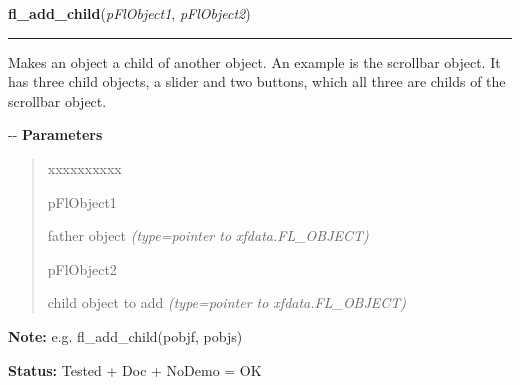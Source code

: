 \hspace{.8\funcindent}\begin{boxedminipage}{\funcwidth}

    \raggedright \textbf{fl\_add\_child}(\textit{pFlObject1}, \textit{pFlObject2})

    \vspace{-1.5ex}

    \rule{\textwidth}{0.5\fboxrule}
\setlength{\parskip}{2ex}

Makes an object a child of another object. An example is the scrollbar
object. It has three child objects, a slider and two buttons, which all
three are childs of the scrollbar object.

-{}-
\setlength{\parskip}{1ex}
      \textbf{Parameters}
      \vspace{-1ex}

      \begin{quote}
        \begin{Ventry}{xxxxxxxxxx}

          \item[pFlObject1]


father object
            {\it (type=pointer to xfdata.FL\_OBJECT)}

          \item[pFlObject2]


child object to add
            {\it (type=pointer to xfdata.FL\_OBJECT)}

        \end{Ventry}

      \end{quote}

\textbf{Note:} 
e.g. fl\_add\_child(pobjf, pobjs)


\textbf{Status:} 
Tested + Doc + NoDemo = OK


    \end{boxedminipage}

    \label{xformslib:flbasic:fl_set_coordunit}

    \vspace{0.5ex}

